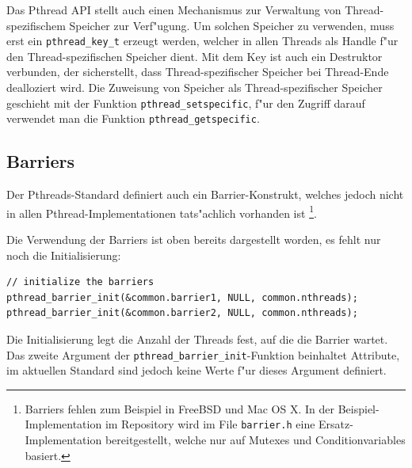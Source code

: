 Das Pthread API stellt auch einen Mechanismus zur Verwaltung von
Thread-spezifischem Speicher zur Verf"ugung. Um solchen Speicher
zu verwenden, muss erst ein \verb+pthread_key_t+ erzeugt werden,
welcher in allen Threads als Handle f"ur den Thread-spezifischen
Speicher dient.
Mit dem Key ist auch ein Destruktor verbunden,
der sicherstellt, dass Thread-spezifischer Speicher bei Thread-Ende 
dealloziert wird. Die Zuweisung von Speicher als Thread-spezifischer
Speicher geschieht mit der Funktion \verb+pthread_setspecific+,
f"ur den Zugriff darauf verwendet man die Funktion \verb+pthread_getspecific+.

\subsection{Barriers}
Der Pthreads-Standard definiert auch ein Barrier-Konstrukt, welches
jedoch nicht in allen Pthread-Implementationen tats"achlich vorhanden ist%
\footnote{Barriers fehlen zum Beispiel in FreeBSD und Mac OS X.
In der Beispiel-Implementation im Repository wird im File
{\tt barrier.h} eine Ersatz-Implementation bereitgestellt, welche nur
auf Mutexes und Conditionvariables basiert.}.

Die Verwendung der Barriers ist oben bereits dargestellt worden, es fehlt
nur noch die Initialisierung:
\begin{verbatim}
// initialize the barriers
pthread_barrier_init(&common.barrier1, NULL, common.nthreads);
pthread_barrier_init(&common.barrier2, NULL, common.nthreads);
\end{verbatim}
Die Initialisierung legt die Anzahl der Threads fest, auf die die Barrier
wartet. Das zweite Argument der \verb+pthread_barrier_init+-Funktion
beinhaltet Attribute, im aktuellen Standard sind jedoch keine Werte
f"ur dieses Argument definiert.

